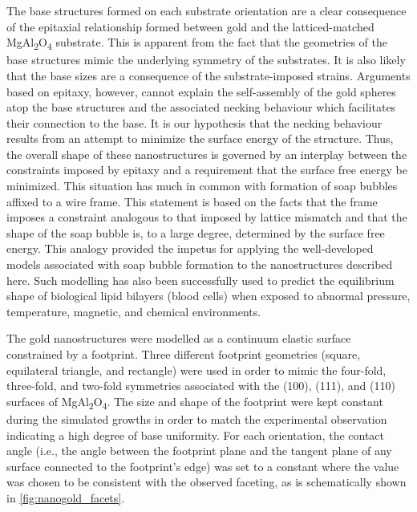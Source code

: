 The base structures formed on each substrate orientation
are a clear consequence of the epitaxial relationship formed
between gold and the latticed-matched MgAl\textsubscript{2}O\textsubscript{4} substrate.
This is apparent from the fact that the geometries of the base
structures mimic the underlying symmetry of the substrates.
It is also likely that the base sizes are a consequence of the
substrate-imposed strains. Arguments based on epitaxy,
however, cannot explain the self-assembly of the gold spheres
atop the base structures and the associated necking behaviour
which facilitates their connection to the base. It is our
hypothesis that the necking behaviour results from an attempt
to minimize the surface energy of the structure. Thus, the
overall shape of these nanostructures is governed by an
interplay between the constraints imposed by epitaxy and a
requirement that the surface free energy be minimized. This
situation has much in common with formation of soap
bubbles affixed to a wire frame\cite{RefWorks:95}. This statement is based
on the facts that the frame imposes a constraint analogous
to that imposed by lattice mismatch and that the shape of
the soap bubble is, to a large degree, determined by the
surface free energy. This analogy provided the impetus for
applying the well-developed models associated with soap
bubble formation to the nanostructures described here. Such
modelling has also been successfully used to predict the
equilibrium shape of biological lipid bilayers (blood cells)
when exposed to abnormal pressure, temperature, magnetic,
and chemical environments\cite{RefWorks:99,RefWorks:102,RefWorks:47,RefWorks:100,RefWorks:101,RefWorks:103}.

The gold nanostructures were modelled as a continuum
elastic surface constrained by a footprint. Three different
footprint geometries (square, equilateral triangle, and rectangle) were used in order to mimic the four-fold, three-fold,
and two-fold symmetries associated with the (100), (111), and (110) surfaces of MgAl\textsubscript{2}O\textsubscript{4}. The size and shape of the
footprint were kept constant during the simulated growths
in order to match the experimental observation indicating a
high degree of base uniformity. For each orientation, the
contact angle (i.e., the angle between the footprint plane and
the tangent plane of any surface connected to the footprint's
edge) was set to a constant where the value was chosen to
be consistent with the observed faceting, as is schematically
shown in \cref{fig:nanogold_facets}.

